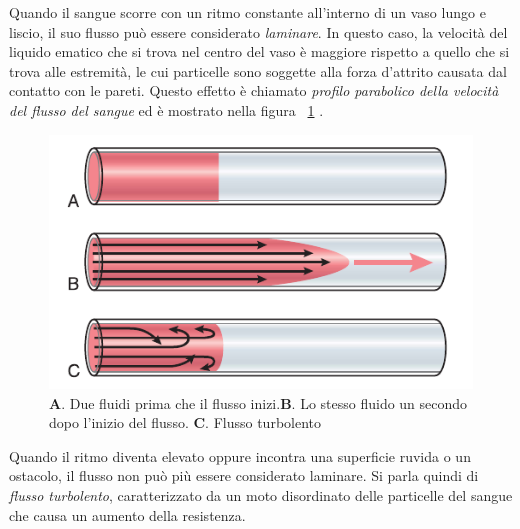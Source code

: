 Quando il sangue scorre con un ritmo constante all'interno di un vaso lungo e liscio, il suo flusso può essere considerato \textit{laminare}. In questo caso, la velocità del liquido ematico che si trova nel centro del vaso è maggiore rispetto a quello che si trova alle estremità, le cui particelle sono soggette alla forza d'attrito causata dal contatto con le pareti. Questo effetto è chiamato \textit{profilo parabolico della velocità del flusso del sangue} ed è mostrato nella figura \Fig~\ref{fig:FlussoParabolico} .
\begin{figure}[h]
	\centering
	\includegraphics[width=0.7\linewidth]{ImageFiles/Fotopletismografia/FlussoParabolico}
	\caption{\textbf{A}. Due fluidi prima che il flusso inizi.\textbf{B}. Lo stesso fluido un secondo dopo l'inizio del flusso. \textbf{C}. Flusso turbolento}
	\label{fig:FlussoParabolico}
\end{figure}
Quando il ritmo diventa elevato oppure incontra una superficie ruvida o un ostacolo, il flusso non può più essere considerato laminare. Si parla quindi di \textit{flusso turbolento}, caratterizzato da un moto disordinato delle particelle del sangue che causa un aumento della resistenza.

